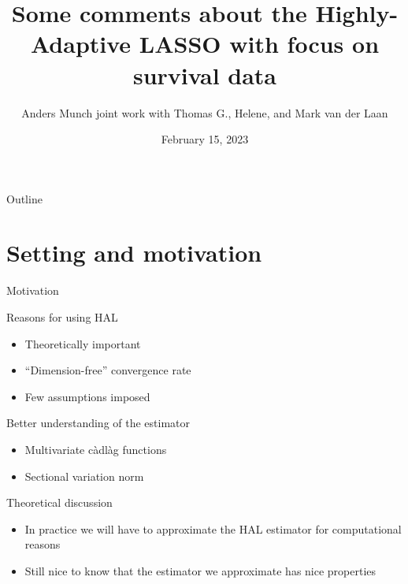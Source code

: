 \documentclass[smaller]{beamer}\usepackage{listings}
\author{Anders Munch \newline \small joint work with Thomas G., Helene, and Mark van der Laan}
\date{February 15, 2023}
\title{Some comments about the Highly-Adaptive LASSO with focus on survival data}
\begin{document}
\maketitle
\begin{frame}{Outline}
\tableofcontents
\end{frame}

\section{Setting and motivation}
\label{sec:orga793e1d}
\begin{frame}[label={sec:orgcbcf9fc}]{Motivation}
\small
\begin{block}{Reasons for using HAL \citep{van2017generally}}
\begin{itemize}
\item Theoretically important
\item ``Dimension-free'' convergence rate
\item Few assumptions imposed
\end{itemize}

\pause  
\end{block}

\begin{block}{Better understanding of the estimator}
\begin{itemize}
\item Multivariate càdlàg functions
\item Sectional variation norm
\end{itemize}

\pause
\end{block}

\begin{block}{Theoretical discussion}
\begin{itemize}
\item In practice we will have to approximate the HAL estimator for computational
reasons
\item Still nice to know that the estimator we approximate has  nice properties
\end{itemize}
\end{block}
\end{frame}
\end{document}

